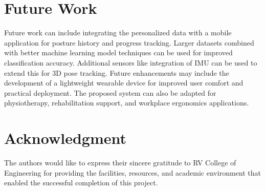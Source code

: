 \documentclass[conference]{IEEEtran}
\begin{document}
\section*{Future Work}
Future work can include integrating the personalized data with a mobile application for posture history and progress tracking. Larger datasets combined with better machine learning model techniques can be used for improved classification accuracy. Additional sensors like integration of IMU can be used to extend this for 3D pose tracking. Future enhancements may include the development of a lightweight wearable device for improved user comfort and practical deployment. The proposed system can also be adapted for physiotherapy, rehabilitation support, and workplace ergonomics applications.

\section*{Acknowledgment}

The authors would like to express their sincere gratitude to RV College of Engineering for providing the facilities, resources, and academic environment that enabled the successful completion of this project.
\end{document}
